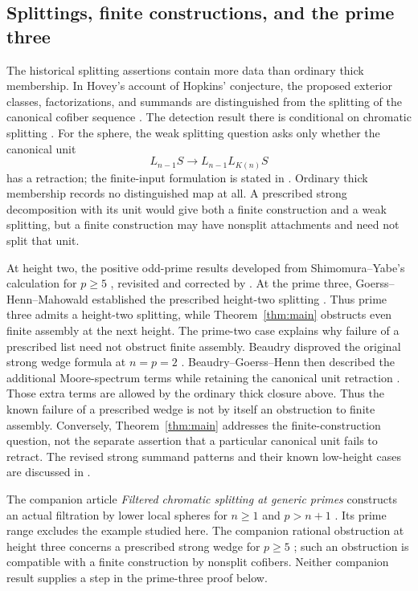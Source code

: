 \subsection{Splittings, finite constructions, and the prime three}

The historical splitting assertions contain more data than ordinary thick
membership. In Hovey's account of Hopkins' conjecture, the proposed exterior
classes, factorizations, and summands are distinguished from the splitting
of the canonical cofiber sequence
\citep[Conjecture~4.2]{Hovey93}. The detection result there is conditional
on chromatic splitting \citep[Theorem~4.3]{Hovey93}. For the sphere, the
weak splitting question asks only whether the canonical unit
\[
          L_{n-1}S\longrightarrow L_{n-1}L_{K(n)}S
\]
has a retraction; the finite-input formulation is stated in
\citet[Conjecture~1.1.11]{BGH2022}. Ordinary thick membership records no
distinguished map at all. A prescribed strong decomposition with its unit
would give both a finite construction and a weak splitting, but a finite
construction may have nonsplit attachments and need not split that unit.

At height two, the positive odd-prime results developed from
Shimomura--Yabe's calculation for \(p\geq5\)
\citep[Theorem~2.4]{ShimomuraYabe95}, revisited and corrected by
\citet[Theorem~7.7 and Remark~7.8]{Behrens12}.
At the prime three, Goerss--Henn--Mahowald established the prescribed
height-two splitting \citep[Theorem~5.11]{GHM14}.
Thus prime three admits a height-two splitting, while
Theorem~\ref{thm:main} obstructs even finite assembly at the next height.
The prime-two case explains why failure of a prescribed list need
not obstruct finite assembly. Beaudry disproved the original strong
wedge formula at \(n=p=2\)
\citep[Theorem~1.4]{Beaudry2017}. Beaudry--Goerss--Henn then described the
additional Moore-spectrum terms while retaining the canonical unit
retraction \citep[Theorem~1.1.6]{BGH2022}. Those extra terms are allowed by
the ordinary thick closure above. Thus the known failure of a prescribed
wedge is not by itself an obstruction to finite assembly. Conversely,
Theorem~\ref{thm:main} addresses the finite-construction question, not the
separate assertion that a particular canonical unit fails to retract.
The revised strong summand patterns and their known low-height cases are
discussed in \citet[Section~6.1]{BB19}.

The companion article \emph{Filtered chromatic splitting at generic primes}
constructs an actual filtration by lower local spheres for \(n\geq1\) and
\(p>n+1\) \citep[Theorem~1.1]{CompanionFiltered}. Its prime range excludes
the example studied here. The companion rational obstruction at height three
concerns a prescribed strong wedge for \(p\geq5\)
\citep[Corollary~1.2]{CompanionRational}; such an obstruction is compatible
with a finite construction by nonsplit cofibers. Neither companion result
supplies a step in the prime-three proof below.

